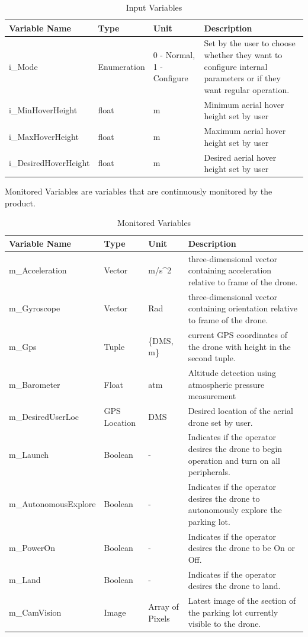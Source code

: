 \documentclass{article}
\begin{document}
\begin{table}[!h]
\begin{center}
\caption {Input Variables} \label{tab:title}
\label{InputVariables}
\begin{tabular}{ | m{3cm} | m{2cm} | m{2cm} | m{6cm} | } 
\hline
 Variable Name & Type & Unit & Description \\ 
 \hline
i\_Mode & Enumeration & 	0 - Normal, 1 - Configure &	Set by the user to choose whether they want to configure internal parameters or if they want regular operation. \\
\hline i\_MinHoverHeight & float	&m	& Minimum aerial hover height set by user\\
\hline i\_MaxHoverHeight & float	&m	& Maximum aerial hover height set by user\\
\hline i\_DesiredHoverHeight & float	&m	& Desired aerial hover height set by user\\
\hline 
\end{tabular}
\end{center}
\end{table}

\newpage
Monitored Variables are variables that are continuously monitored by the product.
\begin{table}[!h]
\begin{center}
\caption {Monitored Variables} \label{tab:title}
\begin{tabular}{ | m{3cm} | m{2cm} | m{2cm} | m{6cm} | } 
\hline
 Variable Name & Type & Unit & Description \\ 
 \hline
m\_Acceleration	& Vector& m/s^2 & three-dimensional vector containing acceleration relative to frame of the drone. \\
\hline
m\_Gyroscope & Vector	&Rad &	 three-dimensional vector containing orientation relative to frame of the drone.\\
\hline
m\_Gps	& Tuple &	\{DMS, m\} &	 current GPS coordinates of the drone with height in the second tuple.\\
\hline
m\_Barometer	& Float&	atm	 &Altitude detection using atmospheric pressure measurement\\
\hline
m\_DesiredUserLoc &	GPS Location& DMS &	 Desired location of the aerial drone set by user.\\
\hline
m\_Launch &	Boolean	 &  - &	Indicates if the operator desires the drone to begin operation and turn on all peripherals.  \\
\hline
m\_AutonomousExplore &	Boolean &	 -	 &Indicates if the operator desires the drone to autonomously explore the parking lot.\\ 
\hline
m\_PowerOn&	Boolean  &	- &	Indicates if the operator desires the drone to be On or Off.\\
\hline
m\_Land&Boolean&	-&	Indicates if the operator desires the drone to land.\\
\hline
 m\_CamVision &	Image&	Array of Pixels&	Latest image of the section of the parking lot currently visible to the drone.\\
\hline

\end{tabular}
\end{center}
\end{table}
\end{document}
